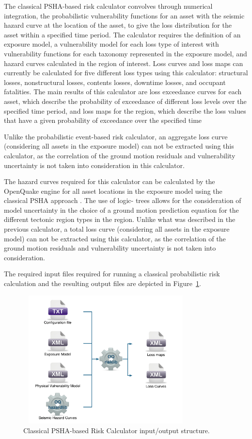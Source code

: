 The classical PSHA-based risk calculator convolves through numerical
integration, the probabilistic vulnerability functions for an asset with the
seismic hazard curve at the location of the asset, to give the loss
distribution for the asset within a specified time period. The calculator
requires the definition of an exposure model, a vulnerability model for each
loss type of interest with vulnerability functions for each taxonomy
represented in the exposure model, and hazard curves calculated in the region
of interest. Loss curves and loss maps can currently be calculated for five
different loss types using this calculator: structural losses, nonstructural
losses, contents losses, downtime losses, and occupant fatalities. The main
results of this calculator are loss exceedance curves for each asset, which
describe the probability of exceedance of different loss levels over the
specified time period, and loss maps for the region, which describe the loss
values that have a given probability of exceedance over the specified time

Unlike the probabilistic event-based risk calculator, an aggregate loss curve
(considering all assets in the exposure model) can not be extracted using this
calculator, as the correlation of the ground motion residuals and
vulnerability uncertainty is not taken into consideration in this calculator.

The hazard curves required for this calculator can be calculated by the
OpenQuake engine for all asset locations in the exposure model using the
classical PSHA approach \citep{cornell1968, mcguire1976}. The use of logic-
trees allows for the consideration of model uncertainty in the choice of a
ground motion prediction equation for the different tectonic region types in
the region. Unlike what was described in the previous calculator, a total loss
curve (considering all assets in the exposure model) can not be extracted
using this calculator, as the correlation of the ground motion residuals and
vulnerability uncertainty is not taken into consideration.

The required input files required for running a classical probabilistic risk
calculation and the resulting output files are depicted in Figure~\ref{fig:io-structure-classical-risk}.

\begin{figure}[ht]
\centering
\includegraphics[width=9cm,height=7cm]{figures/risk/io-structure-classical-risk.pdf}
\caption{Classical PSHA-based Risk Calculator input/output structure.}
\label{fig:io-structure-classical-risk}
\end{figure}